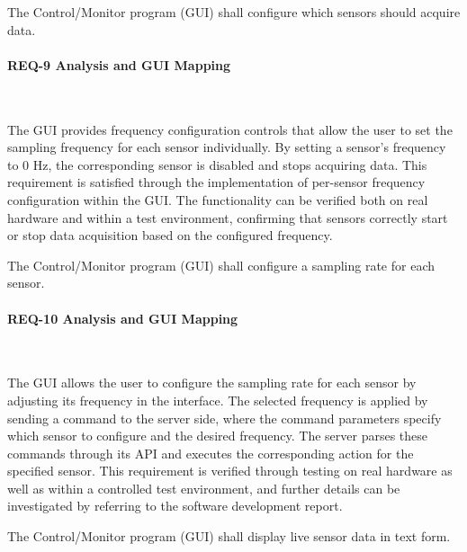 \begin{tcolorbox}[
    title=REQ-9,
    colback=gray!5,
    colframe=gray,
    fonttitle=\bfseries
]
The Control/Monitor program (GUI) shall configure which sensors should acquire data.
\end{tcolorbox}

\paragraph{REQ-9 Analysis and GUI Mapping}\

The GUI provides frequency configuration controls that allow the user to set the 
sampling frequency for each sensor individually. By setting a sensor’s frequency to 0 Hz, 
the corresponding sensor is disabled and stops acquiring data. This requirement is 
satisfied through the implementation of per-sensor frequency configuration within the GUI. 
The functionality can be verified both on real hardware and within a test environment, 
confirming that sensors correctly start or stop data acquisition based on the configured 
frequency.

\begin{tcolorbox}[
    title=REQ-10,
    colback=gray!5,
    colframe=gray,
    fonttitle=\bfseries
]
The Control/Monitor program (GUI) shall configure a sampling rate for each sensor.
\end{tcolorbox}

\paragraph{REQ-10 Analysis and GUI Mapping}\

The GUI allows the user to configure the sampling rate for each sensor by adjusting its 
frequency in the interface. The selected frequency is applied by sending a command to the 
server side, where the command parameters specify which sensor to configure and the 
desired frequency. The server parses these commands through its API and executes the 
corresponding action for the specified sensor. This requirement is verified through
testing on real hardware as well as within a controlled test environment, and further 
details can be investigated by referring to the software development report.


\begin{tcolorbox}[
    title=REQ-11,
    colback=gray!5,
    colframe=gray,
    fonttitle=\bfseries
]

The Control/Monitor program (GUI) shall display live sensor data in text form.
\end{tcolorbox}

